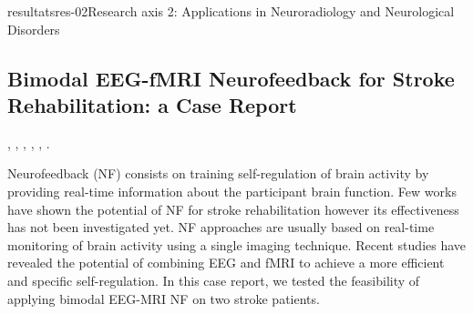 \documentclass{ra2018}
\begin{document}
\begin{module}{resultats}{res-02}{Research axis 2: Applications in Neuroradiology and Neurological Disorders}

\subsection{Bimodal EEG-fMRI Neurofeedback for Stroke Rehabilitation: a Case Report}
\begin{participants}
      , 
      , 
      ,
      ,
      ,
      .
\end{participants}
Neurofeedback  (NF)  consists  on  training  self-regulation  of  brain  activity  by  providing  real-time information about the participant brain function.  Few works have shown the potential of NF for stroke rehabilitation however its effectiveness has not been investigated yet. NF approaches are usually based on real-time monitoring of brain activity using a single imaging technique.  Recent studies have revealed the potential of combining EEG and fMRI to achieve a more efficient and specific self-regulation. In this case report, we tested the feasibility of applying bimodal EEG-MRI NF on two stroke patients.~\cite{lioi:inserm-01932954}




\end{module}
\end{document}

